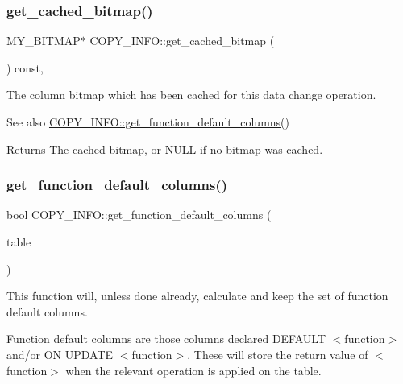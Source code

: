 \subsubsection{\texorpdfstring{get\+\_\+cached\+\_\+bitmap()}{get\_cached\_bitmap()}}
{\footnotesize\ttfamily M\+Y\+\_\+\+B\+I\+T\+M\+AP$\ast$ C\+O\+P\+Y\+\_\+\+I\+N\+F\+O\+::get\+\_\+cached\+\_\+bitmap (\begin{DoxyParamCaption}{ }\end{DoxyParamCaption}) const\hspace{0.3cm}{\ttfamily [inline]}, {\ttfamily [protected]}}

The column bitmap which has been cached for this data change operation. \begin{DoxySeeAlso}{See also}
\mbox{\hyperlink{classCOPY__INFO_a4b096071d98443d6f9a59aafc6da78a0}{C\+O\+P\+Y\+\_\+\+I\+N\+F\+O\+::get\+\_\+function\+\_\+default\+\_\+columns()}}
\end{DoxySeeAlso}
\begin{DoxyReturn}{Returns}
The cached bitmap, or N\+U\+LL if no bitmap was cached. 
\end{DoxyReturn}
\mbox{\label{classCOPY__INFO_a4b096071d98443d6f9a59aafc6da78a0}} 
\subsubsection{\texorpdfstring{get\+\_\+function\+\_\+default\+\_\+columns()}{get\_function\_default\_columns()}}
{\footnotesize\ttfamily bool C\+O\+P\+Y\+\_\+\+I\+N\+F\+O\+::get\+\_\+function\+\_\+default\+\_\+columns (\begin{DoxyParamCaption}\item[{\mbox{\hyperlink{structTABLE}{T\+A\+B\+LE}} $\ast$}]{table }\end{DoxyParamCaption})\hspace{0.3cm}{\ttfamily [protected]}}

This function will, unless done already, calculate and keep the set of function default columns.

Function default columns are those columns declared D\+E\+F\+A\+U\+LT $<$function$>$ and/or ON U\+P\+D\+A\+TE $<$function$>$. These will store the return value of $<$function$>$ when the relevant operation is applied on the table.

